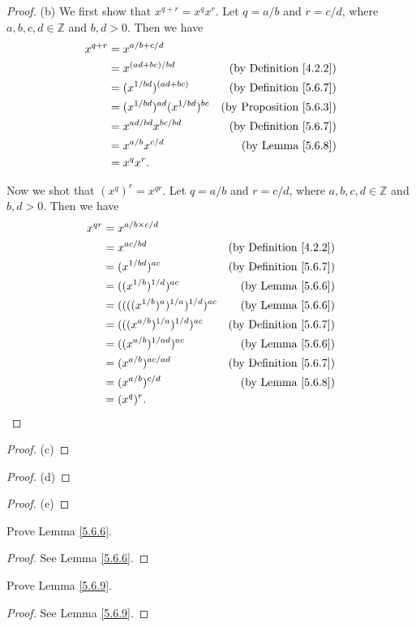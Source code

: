 \begin{proof}{(b)}
We first show that \(x^{q + r} = x^q x^r\).
Let \(q = a / b\) and \(r = c / d\), where \(a, b, c, d \in \mathds{Z}\) and \(b, d > 0\).
Then we have
\begin{align*}
x^{q + r} &= x^{a / b + c / d} \\
&= x^{(ad + bc) / bd} & \text{(by Definition \ref{4.2.2})} \\
&= (x^{1 / bd})^{(ad + bc)} & \text{(by Definition \ref{5.6.7})} \\
&= (x^{1 / bd})^{ad} (x^{1 / bd})^{bc} & \text{(by Proposition \ref{5.6.3})} \\
&= x^{ad / bd} x^{bc / bd} & \text{(by  Definition \ref{5.6.7})} \\
&= x^{a / b} x^{c / d} & \text{(by Lemma \ref{5.6.8})} \\
&= x^q x^r.
\end{align*}

Now we shot that \((x^q)^r = x^{qr}\).
Let \(q = a / b\) and \(r = c / d\), where \(a, b, c, d \in \mathds{Z}\) and \(b, d > 0\).
Then we have
\begin{align*}
x^{qr} &= x^{a / b \times c / d} \\
&= x^{ac / bd} & \text{(by Definition \ref{4.2.2})} \\
&= (x^{1 / bd})^{ac} & \text{(by Definition \ref{5.6.7})} \\
&= ((x^{1 / b})^{1 / d})^{ac} & \text{(by Lemma \ref{5.6.6})} \\
&= ((((x^{1 / b})^a)^{1 / a})^{1 / d})^{ac} & \text{(by Lemma \ref{5.6.6})} \\
&= (((x^{a / b})^{1 / a})^{1 / d})^{ac} & \text{(by Definition \ref{5.6.7})} \\
&= ((x^{a / b})^{1 / ad})^{ac} & \text{(by Lemma \ref{5.6.6})} \\
&= (x^{a / b})^{ac / ad} & \text{(by Definition \ref{5.6.7})} \\
&= (x^{a / b})^{c / d} & \text{(by Lemma \ref{5.6.8})} \\
&= (x^q)^r.
\end{align*}
\end{proof}

\begin{proof}{(c)}

\end{proof}

\begin{proof}{(d)}

\end{proof}

\begin{proof}{(e)}

\end{proof}

\exercisesection

\begin{exercise}\label{ex 5.6.1}
Prove Lemma \ref{5.6.6}.
\end{exercise}

\begin{proof}
See Lemma \ref{5.6.6}.
\end{proof}

\begin{exercise}\label{ex 5.6.2}
Prove Lemma \ref{5.6.9}.
\end{exercise}

\begin{proof}
See Lemma \ref{5.6.9}.
\end{proof}
